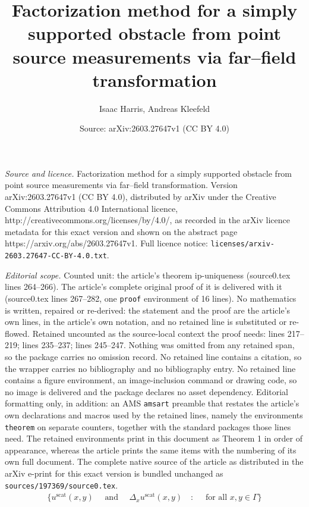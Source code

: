\documentclass[10pt,a4paper]{amsart}
\title{Factorization method for a simply supported obstacle from point source measurements via far--field transformation}
\author{Isaac Harris, Andreas Kleefeld}
\date{Source: arXiv:2603.27647v1 (CC BY 4.0)}
\begin{document}
\maketitle

\noindent\emph{Source and licence.} Factorization method for a simply supported obstacle from point source measurements via far--field transformation. Version arXiv:2603.27647v1 (CC BY 4.0), distributed by arXiv under the Creative Commons Attribution 4.0 International licence, http://creativecommons.org/licenses/by/4.0/, as recorded in the arXiv licence metadata for this exact version and shown on the abstract page https://arxiv.org/abs/2603.27647v1. Full licence notice: \texttt{licenses/arxiv-2603.27647-CC-BY-4.0.txt}.\par\smallskip

\noindent\textit{Editorial scope.} Counted unit: the article's theorem ip-uniqueness (source0.tex lines 264--266). The article's complete original proof of it is delivered with it (source0.tex lines 267--282, one \texttt{proof} environment of 16 lines). No mathematics is written, repaired or re-derived: the statement and the proof are the article's own lines, in the article's own notation, and no retained line is substituted or re-flowed.  Retained uncounted as the source-local context the proof needs: lines 217--219; lines 235--237; lines 245--247.  Nothing was omitted from any retained span, so the package carries no omission record.  No retained line contains a citation, so the wrapper carries no bibliography and no bibliography entry.  No retained line contains a figure environment, an image-inclusion command or drawing code, so no image is delivered and the package declares no asset dependency.  Editorial formatting only, in addition: an AMS \texttt{amsart} preamble that restates the article's own declarations and macros used by the retained lines, namely the environments \texttt{theorem} on separate counters, together with the standard packages those lines need.  The retained environments print in this document as Theorem 1 in order of appearance, whereas the article prints the same items with the numbering of its own full document.  The complete native source of the article as distributed in the arXiv e-print for this exact version is bundled unchanged as \texttt{sources/197369/source0.tex}.
\begin{align} \label{nf-data}
\big\{ u^{\text{scat}}( x , y) \quad \text{ and } \quad \Delta_x u^{\text{scat}}( x , y) \quad : \quad \text{ for all $x,y \in \Gamma$} \big\}
\end{align}
\end{document}
